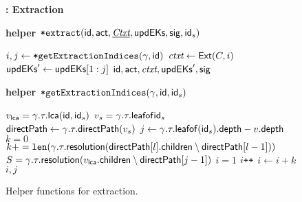 \begin{figure}[ht]

  \begin{anybox}{\sffamily\bfseries \saik : Extraction}
    \begin{minipage}[t]{\linewidth}
      {\bf {helper ${\textnormal{\tt*extract}}({\mathsf{id}}, \mathsf{act}, \underline{{\normalfont\textit{Ctxt}}}, {\mathsf{updEKs}}, {\mathsf{sig}}, {\mathsf{id}}_s)$}}
      \begin{algorithmic}
        \State $i,j \gets {\ensuremath{\textnormal{\tt*getExtractionIndices}}}(\gamma, {\mathsf{id}})$
        \State ${\normalfont\textit{ctxt}} \gets {\ensuremath{\mathsf{Ext}}}(C, i)$
        \State ${\mathsf{updEKs}}' \gets {\ensuremath{\mathsf{updEKs}}}[1:j]$
        \State \Return ${\mathsf{id}}, \mathsf{act}, {\normalfont\textit{ctxt}}, {\mathsf{updEKs}}', {\mathsf{sig}}$
      \end{algorithmic}

      \medskip
      {\bf {helper ${\textnormal{\tt*getExtractionIndices}}(\gamma, {\mathsf{id}}, {\mathsf{id}}_s)$}}
      \begin{algorithmic}
        \State $v_{{\mathsf{lca}}} = \gamma.\tau.{\mathsf{lca}}({\mathsf{id}},{\mathsf{id}}_s)$
        \State $v_s = \gamma.\tau.{\mathsf{leafof}}{{\mathsf{id}}_s}$
        \State ${\mathsf{directPath}} \gets \gamma.\tau.{\mathsf{directPath}}(v_s)$
        \State {}
        \State $j \gets \gamma.\tau.{\mathsf{leafof}}({\mathsf{id}}_s).{\mathsf{depth}} - v.{\mathsf{depth}}$
        \State {}
        \State $k = 0$
        \State $k += \texttt{len}(\gamma.\tau.{\mathsf{resolution}}({\mathsf{directPath}}[l].{\mathsf{children}}\setminus {\ensuremath{\mathsf{directPath}}}[l-1]))$
        \EndFor
        \State $S = \gamma.\tau.{\mathsf{resolution}}(v_{{\mathsf{lca}}}.{\mathsf{children}}\setminus {\ensuremath{\mathsf{directPath}}}[j-1])$
        \State $i = 1$
        \State $i\texttt{++}$
        \EndWhile
        \State $i \gets i + k$
        \State \Return $i,j$
      \end{algorithmic}
    \end{minipage}
  \end{anybox}
  \caption{Helper functions for extraction.}
  \label{fig:saik-extraction-alg}
\end{figure}
